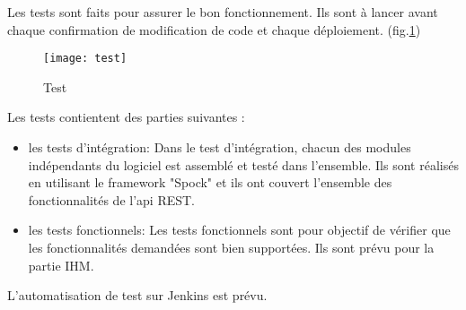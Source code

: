 Les tests sont faits pour assurer le bon fonctionnement.
Ils sont à lancer avant chaque confirmation de modification de code et chaque déploiement. (fig.\ref{fig:test})

\begin{figure}[ht]
 \centering
 \texttt{[image: test]}
 \caption{Test}
 \label{fig:test}
\end{figure}

Les tests contientent des parties suivantes :
\begin{itemize}
 \item les tests d'intégration:
       Dans le test d’intégration, chacun des modules indépendants du logiciel est assemblé et testé dans l’ensemble.
       Ils sont réalisés en utilisant le framework "Spock" et ils ont couvert l'ensemble des fonctionnalités de l'api REST.
 \item les tests fonctionnels:
       Les tests fonctionnels sont pour objectif de  vérifier que les fonctionnalités demandées sont bien supportées.
       Ils sont prévu pour la partie IHM.
\end{itemize}

L'automatisation de test sur Jenkins est prévu.

\clearpage
